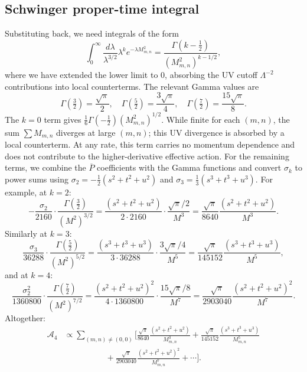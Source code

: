 \subsection{Schwinger proper-time integral}
Substituting back, we need integrals of the form
\begin{equation}
\int_0^\infty \frac{d\lambda}{\lambda^{3/2}}\lambda^k e^{-\lambda M_{m,n}^2}
=\frac{\Gamma(k-\tfrac{1}{2})}{(M_{m,n}^2)^{k-1/2}},
\end{equation}
where we have extended the lower limit to 0, absorbing the UV cutoff $\Lambda^{-2}$ contributions into local counterterms.
The relevant Gamma values are
\begin{equation}
\Gamma\!\left(\tfrac{3}{2}\right) = \frac{\sqrt\pi}{2},\quad
\Gamma\!\left(\tfrac{5}{2}\right) = \frac{3\sqrt\pi}{4},\quad
\Gamma\!\left(\tfrac{7}{2}\right) = \frac{15\sqrt\pi}{8}.
\end{equation}
The $k=0$ term gives $\frac{1}{6}\Gamma(-\frac{1}{2})(M_{m,n}^2)^{1/2}$. While finite for each $(m,n)$, the sum $\sum M_{m,n}$ diverges at large $(m,n)$; this UV divergence is absorbed by a local counterterm. At any rate, this term carries no momentum dependence and does not contribute to the higher-derivative effective action.
For the remaining terms, we combine the $\overline{P}$ coefficients with the Gamma functions and convert $\sigma_k$ to power sums using $\sigma_2 = -\frac{1}{2}(s^2+t^2+u^2)$ and $\sigma_3 = \frac{1}{3}(s^3+t^3+u^3)$.
For example, at $k=2$:
\begin{equation}
-\frac{\sigma_2}{2160}\cdot\frac{\Gamma(\tfrac{3}{2})}{(M^2)^{3/2}}
=\frac{(s^2+t^2+u^2)}{2\cdot 2160}\cdot\frac{\sqrt\pi/2}{M^3}
=\frac{\sqrt\pi}{8640}\frac{(s^2+t^2+u^2)}{M^3}.
\end{equation}
Similarly at $k=3$:
\begin{equation}
\frac{\sigma_3}{36288}\cdot\frac{\Gamma(\tfrac{5}{2})}{(M^2)^{5/2}}
=\frac{(s^3+t^3+u^3)}{3\cdot 36288}\cdot\frac{3\sqrt\pi/4}{M^5}
=\frac{\sqrt\pi}{145152}\frac{(s^3+t^3+u^3)}{M^5},
\end{equation}
and at $k=4$:
\begin{equation}
\frac{\sigma_2^2}{1360800}\cdot\frac{\Gamma(\tfrac{7}{2})}{(M^2)^{7/2}}
=\frac{(s^2+t^2+u^2)^2}{4\cdot 1360800}\cdot\frac{15\sqrt\pi/8}{M^7}
=\frac{\sqrt\pi}{2903040}\frac{(s^2+t^2+u^2)^2}{M^7}.
\end{equation}
Altogether:
\begin{equation}
\begin{aligned}
\mathcal{A}_4
&\propto \sum_{(m,n)\neq(0,0)} \Bigg[
\frac{\sqrt{\pi}}{8640}\frac{(s^2+t^2+u^2)}{M_{m,n}^3}
+\frac{\sqrt{\pi}}{145152}\frac{(s^3+t^3+u^3)}{M_{m,n}^5}\\
&\qquad\qquad\quad+\frac{\sqrt{\pi}}{2903040}\frac{(s^2+t^2+u^2)^2}{M_{m,n}^7}
+\cdots
\Bigg].
\end{aligned}
\end{equation}

